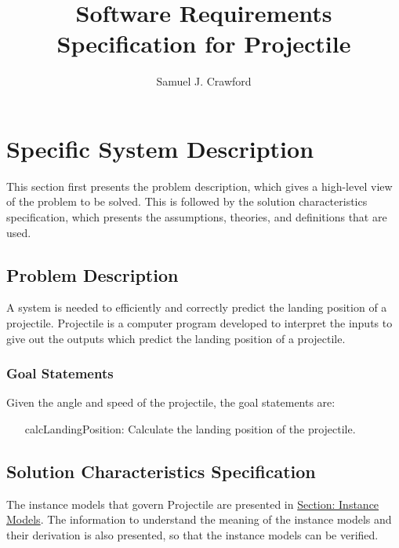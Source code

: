 \documentclass[12pt]{article}
\title{Software Requirements Specification for Projectile}
\author{Samuel J. Crawford}
\begin{document}
\maketitle
\tableofcontents
\newpage
\section{Specific System Description}
\label{Sec:SpecSystDesc}
This section first presents the problem description, which gives a high-level view of the problem to be solved. This is followed by the solution characteristics specification, which presents the assumptions, theories, and definitions that are used.
\subsection{Problem Description}
\label{Sec:ProbDesc}
A system is needed to efficiently and correctly predict the landing position of a projectile. Projectile is a computer program developed to interpret the inputs to give out the outputs which predict the landing position of a projectile.
\subsubsection{Goal Statements}
\label{Sec:GoalStmt}
Given the angle and speed of the projectile, the goal statements are:
\begin{itemize}
\item[calcLandingPosition:\phantomsection\label{calcPosition}]Calculate the landing position of the projectile.
\end{itemize}
\subsection{Solution Characteristics Specification}
\label{Sec:SolCharSpec}
The instance models that govern Projectile are presented in \hyperref[Sec:IMs]{Section: Instance Models}. The information to understand the meaning of the instance models and their derivation is also presented, so that the instance models can be verified.
\end{document}
